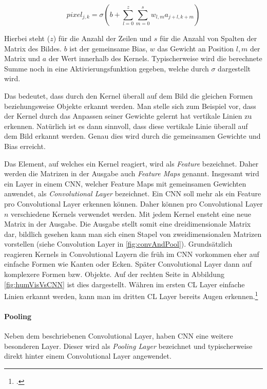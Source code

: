 \begin{equation}
    \label{eq:actSharedWeights}
    pixel_{j,k} = \sigma\left(b+\sum_{l=0}^{z} \sum_{m=0}^{s} w_{l, m} a_{j+l, k+m}\right)
\end{equation}

Hierbei steht ($z$) für die Anzahl der Zeilen und $s$ für die Anzahl von Spalten der Matrix des Bildes. $b$ ist der gemeinsame Bias, $w$ das Gewicht an Position $l,m$ der Matrix und $a$ der Wert innerhalb des Kernels. Typischerweise wird die berechnete Summe noch in eine Aktivierungsfunktion gegeben, welche durch $\sigma$ dargestellt wird.

Das bedeutet, dass durch den Kernel überall auf dem Bild die gleichen Formen beziehungsweise Objekte erkannt werden. Man stelle sich zum Beispiel vor, dass der Kernel durch das Anpassen seiner Gewichte gelernt hat vertikale Linien zu erkennen. Natürlich ist es dann sinnvoll, dass diese vertikale Linie überall auf dem Bild erkannt werden. Genau dies wird durch die gemeinsamen Gewichte und Bias erreicht.

Das Element, auf welches ein Kernel reagiert, wird als \textit{Feature} bezeichnet. Daher werden die Matrizen in der Ausgabe auch \textit{Feature Maps} genannt. Insgesamt wird ein Layer in einem \ac{CNN}, welcher Feature Maps mit gemeinsamen Gewichten anwendet, als \textit{Convolutional Layer} bezeichnet. Ein \ac{CNN} soll mehr als ein Feature pro Convolutional Layer erkennen können. Daher können pro Convolutional Layer $n$ verschiedene Kernels verwendet werden. Mit jedem Kernel ensteht eine neue Matrix in der Ausgabe. Die Ausgabe stellt somit eine dreidimensionale Matrix dar, bildlich gesehen kann man sich einen Stapel von zweidimensionalen Matrizen vorstellen (siehe Convolution Layer in \ref{fig:convAndPool}).
Grundsätzlich reagieren Kernels in Convolutional Layern die früh im \ac{CNN} vorkommen eher auf einfache Formen wie Kanten oder Ecken. Später Convolutional Layer dann auf komplexere Formen bzw. Objekte. Auf der rechten Seite in Abbildung \ref{fig:humVisVsCNN} ist dies dargestellt. Währen im ersten CL Layer einfache Linien erkannt werden, kann man im dritten CL Layer bereits Augen erkennen.\footcite[Vgl.][S. 169-171]{nielsenNeuralNetworksDeep2015}

\paragraph{Pooling}
Neben dem beschriebenen Convolutional Layer, haben \ac{CNN} eine weitere besonderen Layer. Dieser wird als \textit{Pooling Layer} bezeichnet und typischerweise direkt hinter einem Convolutional Layer angewendet. 

